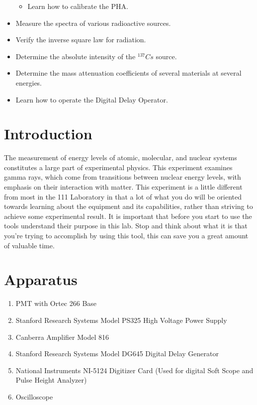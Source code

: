 \documentclass{../lab}
\begin{document}
\begin{itemize}
\begin{itemize}
        \item Learn how to calibrate the PHA.

    \end{itemize}

    \item Measure the spectra of various radioactive sources.

    \item Verify the inverse square law for radiation.

    \item Determine the absolute intensity of the $^{137}Cs$ source.

    \item Determine the mass attenuation coefficients of several materials at several energies.

    \item Learn how to operate the Digital Delay Operator.

\end{itemize}

\section{Introduction}

The measurement of energy levels of atomic, molecular, and nuclear systems constitutes a large part of experimental physics. This experiment examines gamma rays, which come from transitions between nuclear energy levels, with emphasis on their interaction with matter. This experiment is a little different from most in the 111 Laboratory in that a lot of what you do will be oriented towards learning about the equipment and its capabilities, rather than striving to achieve some experimental result. It is important that before you start to use the tools understand their purpose in this lab. Stop and think about what it is that you're trying to accomplish by using this tool, this can save you a great amount of valuable time.

\section{Apparatus}

\begin{enumerate}
    \item PMT with Ortec 266 Base

    \item Stanford Research Systems Model PS325 High Voltage Power Supply

    \item Canberra Amplifier Model 816

    \item Stanford Research Systems Model DG645 Digital Delay Generator

    \item National Instruments NI-5124 Digitizer Card (Used for digital Soft Scope and Pulse Height Analyzer)

    \item Oscilloscope

\end{enumerate}
\end{document}
